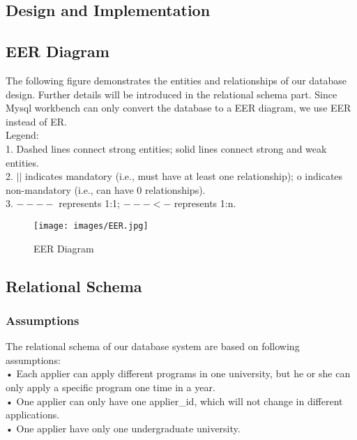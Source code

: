 \documentclass[12pt, a4paper]{article}
\begin{document}
\begin{spacing}{1.32}
\section{Design and Implementation}

\subsection{EER Diagram}
The following figure demonstrates the entities and relationships of our database design. Further details will be introduced in the relational schema part. Since Mysql workbench can only convert the database to a EER diagram, we use EER instead of ER. \\
\newpage
\noindent
Legend:\\
1. Dashed lines connect strong entities; solid lines connect strong and weak entities.\\
2. $||$ indicates mandatory (i.e., must have at least one relationship); o indicates non-mandatory (i.e., can have 0 relationships).\\
3. $----$ represents 1:1; $---<-$ represents 1:n.
\begin{figure}
    \centering
    \texttt{[image: images/EER.jpg]}
    \caption{EER Diagram}
    \label{EER diagram}
\end{figure}


\subsection{Relational Schema}
\subsubsection{Assumptions}
\noindent
The relational schema of our database system are based on following assumptions:\\
• Each applier can apply different programs in one university, but he or she can only apply a specific program one time in a year.\\
• One applier can only have one applier\_id, which will not change in different applications.\\
• One applier have only one undergraduate university.\\

\end{spacing}
\end{document}
